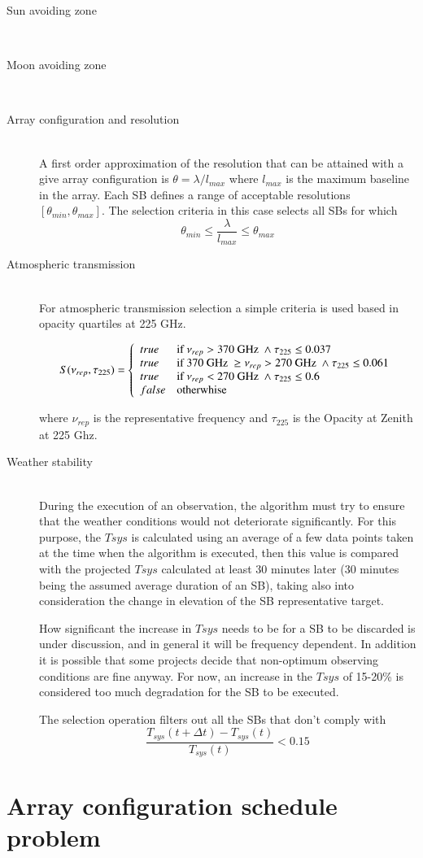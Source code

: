\begin{description}
\item[Sun avoiding zone] \hfill \\

\item[Moon avoiding zone] \hfill \\

\item[Array configuration and resolution] \hfill \\
A first order approximation of the resolution that can be attained with a give
array configuration is $\theta = \lambda / l_{max}$ where $l_{max}$ is the maximum
baseline in the array. Each SB defines a range of acceptable resolutions $[\theta_{min}, \theta_{max}]$.
The selection criteria in this case selects all SBs for which
$$
\theta_{min} \leq \frac{\lambda}{l_{max}} \leq \theta_{max}
$$

\item[Atmospheric transmission] \hfill \\
For atmospheric transmission selection a simple criteria is used based in opacity quartiles at 225 GHz.

$$
S(\nu_{rep}, \tau_{225}) = \left\{
    \begin{array}{l l}
    true & \mbox{if } \nu_{rep} > 370 \mbox{ GHz } \land \tau_{225} \leq 0.037 \\
    true & \mbox{if } 370 \mbox{ GHz } \geq \nu_{rep} > 270 \mbox{ GHz } \land \tau_{225} \leq 0.061 \\
    true & \mbox{if } \nu_{rep} < 270 \mbox{ GHz } \land \tau_{225} \leq 0.6\\
    false & \mbox{otherwhise}
    \end{array} \right . 
$$

where $\nu_{rep}$ is the representative frequency and $\tau_{225}$ is the Opacity
at Zenith at 225 Ghz.

\item[Weather stability] \hfill \\
During the execution of an observation, the algorithm must try to ensure that the weather conditions would not deteriorate significantly.
For this purpose, the $Tsys$ is calculated using an average of a few data
points taken at the time when the algorithm is executed, then this value is compared with the
projected $Tsys$ calculated at least 30 minutes later (30 minutes being the assumed
average duration of an SB), taking also into consideration the change in elevation
of the SB representative target.

How significant the increase in $Tsys$ needs to be for a SB to be discarded
is under discussion, and in general it will be frequency dependent. In addition
it is possible that some projects decide that non-optimum observing conditions are
fine anyway. For now, an increase in the $Tsys$  of 15-20\% is considered too much
degradation for the SB to be executed.

The selection operation filters out all the SBs that don't comply with
$$
\frac{T_{sys}(t+\Delta t) - T_{sys}(t)}{T_{sys}(t)} < 0.15
$$

\end{description}

\section{Array configuration schedule problem}
